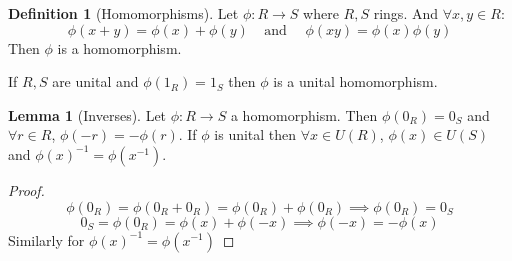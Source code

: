 \documentclass[11pt,a4paper]{article}
\theoremstyle{definition}
\newtheorem{definition}[theorem]{Definition}
\newtheorem{lemma}[theorem]{Lemma}
\begin{document}
\begin{definition}[Homomorphisms]
Let $\phi: R \longrightarrow S$ where $R, S$ rings. And $\forall x, y \in R$:
\[
	\phi(x + y) = \phi(x) + \phi(y) \ \ \ \ \ \text{and} \ \ \ \ \ \  \phi(xy) = \phi(x) \phi(y)
\]
Then $\phi$ is a homomorphism.

If $R, S$ are unital and $\phi(1_R) = 1_S$ then $\phi$ is a unital homomorphism.
\end{definition}

\begin{lemma}[Inverses]
Let $\phi: R \longrightarrow S$ a homomorphism. Then $\phi(0_R) = 0_S$ and $\forall r \in R$,  $\phi(-r) = -\phi(r)$. If $\phi$ is unital then $\forall x \in U(R)$, $\phi(x) \in U(S)$ and $\phi(x)^{-1} = \phi(x^{-1})$.
\end{lemma}

\begin{proof}
\[
	\phi(0_R) = \phi(0_R + 0_R) = \phi(0_R) + \phi(0_R) \implies \phi(0_R) = 0_S
\]
\[
	0_S = \phi(0_R) = \phi(x) + \phi(-x) \implies \phi(-x) = -\phi(x) 
\]
Similarly for $\phi(x)^{-1} = \phi(x^{-1})$
\end{proof}
\end{document}

